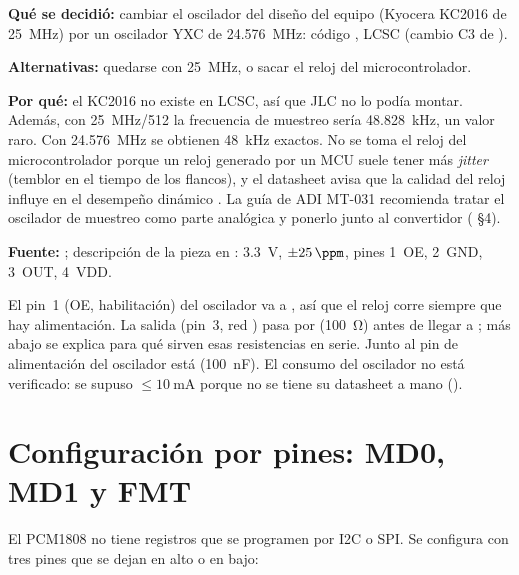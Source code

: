\begin{decision}
\textbf{Qué se decidió:} cambiar el oscilador del diseño del equipo (Kyocera KC2016 de \SI{25}{\mega\hertz}) por un oscilador YXC de \SI{24.576}{\mega\hertz}: código , LCSC  (cambio C3 de ).

\textbf{Alternativas:} quedarse con \SI{25}{\mega\hertz}, o sacar el reloj del microcontrolador.

\textbf{Por qué:} el KC2016 no existe en LCSC, así que JLC no lo podía montar. Además, con \SI{25}{\mega\hertz}/512 la frecuencia de muestreo sería \SI{48.828}{\kilo\hertz}, un valor raro. Con \SI{24.576}{\mega\hertz} se obtienen \SI{48}{\kilo\hertz} exactos. No se toma el reloj del microcontrolador porque un reloj generado por un MCU suele tener más \emph{jitter} (temblor en el tiempo de los flancos), y el datasheet avisa que la calidad del reloj influye en el desempeño dinámico . La guía de ADI MT-031 \copia{} recomienda tratar el oscilador de muestreo como parte analógica y ponerlo junto al convertidor ( §4).

\textbf{Fuente:} ; descripción de la pieza en : \SI{3.3}{\volt}, $\pm\SI{25}{\ppm}$, pines 1~OE, 2~GND, 3~OUT, 4~VDD.
\end{decision}

El pin~1 (OE, habilitación) del oscilador va a , así que el reloj corre siempre que hay alimentación. La salida (pin~3, red ) pasa por  (\SI{100}{\ohm}) antes de llegar a ; más abajo se explica para qué sirven esas resistencias en serie. Junto al pin de alimentación del oscilador está  (\SI{100}{\nano\farad}). El consumo del oscilador no está verificado: se supuso $\le\SI{10}{\milli\ampere}$ \estimado{} porque no se tiene su datasheet a mano ().

\section{Configuración por pines: MD0, MD1 y FMT}\label{sec:c04-straps}

El PCM1808 no tiene registros que se programen por I2C o SPI. Se configura con tres pines que se dejan en alto o en bajo:

